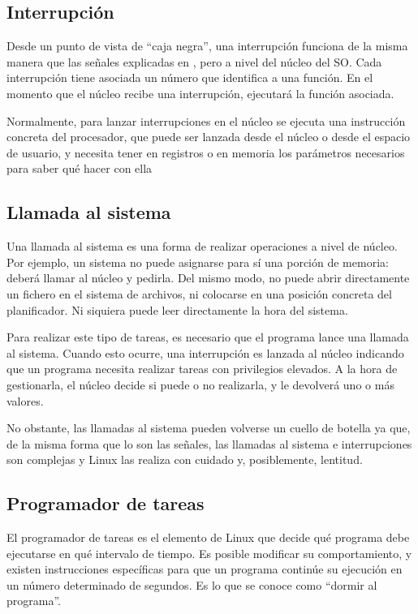 \subsection{Interrupción}
Desde un punto de vista de ``caja negra'', una interrupción funciona de la misma manera que las señales explicadas en 
, pero a nivel del núcleo del \gls{SO}. Cada interrupción tiene asociada un número que identifica a una 
función. En el momento que el núcleo recibe una interrupción, ejecutará la función asociada.

Normalmente, para lanzar interrupciones en el núcleo se ejecuta una instrucción concreta del procesador, que puede ser 
lanzada desde el núcleo o desde el espacio de usuario, y necesita tener en registros o en memoria los parámetros 
necesarios para saber qué hacer con ella

\subsection{Llamada al sistema}
Una llamada al sistema es una forma de realizar operaciones a nivel de núcleo. Por ejemplo, un sistema no puede 
asignarse para sí una porción de memoria: deberá llamar al núcleo y pedirla. Del mismo modo, no puede abrir 
directamente un fichero en el sistema de archivos, ni colocarse en una posición concreta del planificador. Ni siquiera 
puede leer directamente la hora del sistema.

Para realizar este tipo de tareas, es necesario que el programa lance una llamada al sistema. Cuando esto ocurre, una 
interrupción es lanzada al núcleo indicando que un programa necesita realizar tareas con privilegios elevados. A la 
hora de gestionarla, el núcleo decide si puede o no realizarla, y le devolverá uno o más valores.

No obstante, las llamadas al sistema pueden volverse un cuello de botella ya que, de la misma forma que lo son las 
señales, las llamadas al sistema e interrupciones son complejas y Linux las realiza con cuidado y, posiblemente, 
lentitud.

\subsection{Programador de tareas}
El programador de tareas es el elemento de Linux que decide qué programa debe ejecutarse en qué intervalo de tiempo. Es 
posible modificar su comportamiento, y existen instrucciones específicas para que un programa continúe su ejecución en 
un número determinado de segundos. Es lo que se conoce como ``dormir al programa''.

